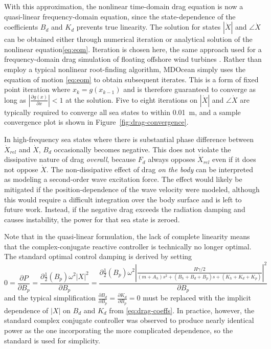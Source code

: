 With this approximation, the nonlinear time-domain drag equation is now a quasi-linear frequency-domain equation, since the state-dependence of the coefficients $B_{d}$ and $K_{d}$ prevents true linearity.
The solution for states $|\dot{X}|$ and $\angle \dot{X}$ can be obtained either through numerical iteration or analytical solution of the nonlinear equation\eqref{eq:eom}.
Iteration is chosen here, the same approach used for a frequency-domain drag simulation of floating offshore wind turbines \cite{hall_open-source_2022}.
Rather than employ a typical nonlinear root-finding algorithm, MDOcean simply uses the equation of motion \eqref{eq:eom} to obtain subsequent iterates.
This is a form of fixed point iteration where $x_k = g(x_{k-1})$ and is therefore guaranteed to converge as long as $|\frac{\partial g(x)}{\partial x}| < 1$ at the solution. %
Five to eight iterations on $|\dot{X}|$ and $\angle \dot{X}$ are typically required to converge all sea states to within 0.01~m, %
and a sample convergence plot is shown in Figure~\ref{fig:drag-convergence}.

In high-frequency sea states where there is substantial phase difference between $\dot{X}_{rel}$ and $\dot{X}$, $B_d$ occasionally becomes negative.
This does not violate the dissipative nature of drag \textit{overall}, because $F_d$ always opposes $\dot{X}_{rel}$ even if it does not oppose $\dot{X}$.
The non-dissipative effect of drag \textit{on the body} can be interpreted as modeling a second-order wave excitation force.
The effect would likely be mitigated if the position-dependence of the wave velocity were modeled, although this would require a difficult integration over the body surface and is left to future work.
Instead, if the negative drag exceeds the radiation damping and causes instability, the power for that sea state is zeroed.

Note that in the quasi-linear formulation, the lack of complete linearity means that the complex-conjugate reactive controller is technically no longer optimal.
The standard optimal control damping is derived by setting
\begin{equation}
0 = \frac{\partial P}{\partial B_p} = \frac{\partial \frac{1}{2} (B_p) \omega^2 |X|^2}{\partial B_p} = \frac{\partial \frac{1}{2} (B_p) \omega^2 |\frac{H\gamma/2}{(m+A_h)s^2+(B_h+B_d+B_p)s+(K_h+K_d+K_p)}|^2}{\partial B_p} 
\end{equation}
and the typical simplification $\frac{\partial B_d}{\partial B_p}=\frac{\partial K_d}{\partial B_p}=0$ must be replaced with the implicit dependence of $|X|$ on $B_d$ and $K_d$ from \eqref{eq:drag-coeffs}.
In practice, however, the standard complex conjugate controller was observed to produce nearly identical power as the one incorporating the more complicated dependence, so the standard is used for simplicity.

